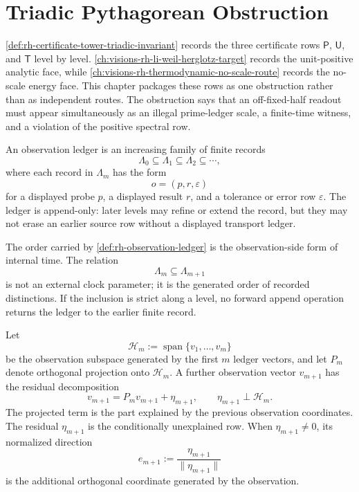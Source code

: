 \chapter{Triadic Pythagorean Obstruction}
\label{ch:visions-rh-triadic-pythagorean-obstruction}

\autoref{def:rh-certificate-tower-triadic-invariant} records the three
certificate rows $\mathsf P$, $\mathsf U$, and $\mathsf T$ level by
level.  \autoref{ch:visions-rh-li-weil-herglotz-target} records the
unit-positive analytic face, while
\autoref{ch:visions-rh-thermodynamic-no-scale-route} records the
no-scale energy face.  This chapter packages these rows as one
obstruction rather than as independent routes.  The obstruction says that
an off-fixed-half readout must appear simultaneously as an illegal
prime-ledger scale, a finite-time witness, and a violation of the
positive spectral row.

\begin{definition}
\label{def:rh-observation-ledger}
An observation ledger is an increasing family of finite records
$$
\Lambda_0\subseteq\Lambda_1\subseteq\Lambda_2\subseteq\cdots,
$$
where each record in $\Lambda_m$ has the form
$$
o=(p,r,\varepsilon)
$$
for a displayed probe $p$, a displayed result $r$, and a tolerance or
error row $\varepsilon$.  The ledger is append-only: later levels may
refine or extend the record, but they may not erase an earlier source row
without a displayed transport ledger.
\end{definition}

\begin{principle}
\label{prin:rh-observation-order-internal-time}
The order carried by \autoref{def:rh-observation-ledger} is the
observation-side form of internal time.  The relation
$$
\Lambda_m\subseteq\Lambda_{m+1}
$$
is not an external clock parameter; it is the generated order of
recorded distinctions.  If the inclusion is strict along a level, no
forward append operation returns the ledger to the earlier finite record.
\end{principle}

\begin{definition}
\label{def:rh-residual-coordinate-from-observation}
Let
$$
\mathcal H_m:=\operatorname{span}\{v_1,\ldots,v_m\}
$$
be the observation subspace generated by the first $m$ ledger vectors,
and let $P_m$ denote orthogonal projection onto $\mathcal H_m$.  A
further observation vector $v_{m+1}$ has the residual decomposition
$$
v_{m+1}=P_m v_{m+1}+\eta_{m+1},
\qquad
\eta_{m+1}\perp\mathcal H_m.
$$
The projected term is the part explained by the previous observation
coordinates.  The residual $\eta_{m+1}$ is the conditionally unexplained
row.  When $\eta_{m+1}\ne0$, its normalized direction
$$
e_{m+1}:=\frac{\eta_{m+1}}{\|\eta_{m+1}\|}
$$
is the additional orthogonal coordinate generated by the observation.
\end{definition}

